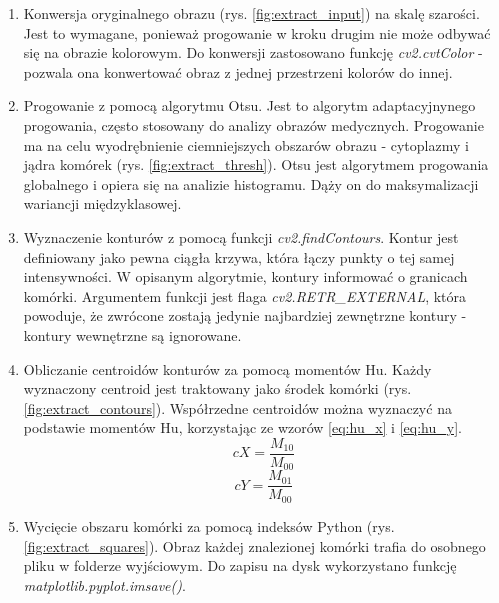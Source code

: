 \begin{enumerate}
    \item Konwersja oryginalnego obrazu (rys. \ref{fig:extract_input}) na skalę szarości.
    Jest to wymagane, ponieważ progowanie w kroku drugim nie może odbywać się na obrazie kolorowym.
    Do konwersji zastosowano funkcję \textit{cv2.cvtColor} - pozwala ona konwertować obraz z jednej przestrzeni kolorów do innej.
    \item Progowanie z pomocą algorytmu Otsu.
    Jest to algorytm adaptacyjnynego progowania, często stosowany do analizy obrazów medycznych.
    Progowanie ma na celu wyodrębnienie ciemniejszych obszarów obrazu - cytoplazmy i jądra komórek (rys. \ref{fig:extract_thresh}). Otsu jest algorytmem progowania globalnego i opiera się na analizie histogramu.
    Dąży on do maksymalizacji wariancji międzyklasowej.
    \item Wyznaczenie konturów z pomocą funkcji \textit{cv2.findContours}. Kontur jest definiowany jako pewna ciągła krzywa, która łączy punkty o tej samej intensywności.
    W opisanym algorytmie, kontury informować o granicach komórki. Argumentem funkcji jest flaga \textit{cv2.RETR\_EXTERNAL}, która powoduje, że zwrócone zostają jedynie najbardziej zewnętrzne kontury - kontury wewnętrzne są ignorowane.
    \item Obliczanie centroidów konturów za pomocą momentów Hu. Każdy wyznaczony centroid jest traktowany jako środek komórki (rys. \ref{fig:extract_contours}). Współrzedne centroidów można wyznaczyć na podstawie momentów Hu, korzystając ze wzorów \ref{eq:hu_x} i \ref{eq:hu_y}.
    \begin{equation}
        cX = \dfrac{M_{10}}{M_{00}}\label{eq:hu_x}
    \end{equation}
    \begin{equation}
        cY = \dfrac{M_{01}}{M_{00}}\label{eq:hu_y}
    \end{equation}
    \item Wycięcie obszaru komórki za pomocą indeksów Python (rys. \ref{fig:extract_squares}). Obraz każdej znalezionej komórki trafia do osobnego pliku w folderze wyjściowym. Do zapisu na dysk wykorzystano funkcję \textit{matplotlib.pyplot.imsave()}.
\end{enumerate}
